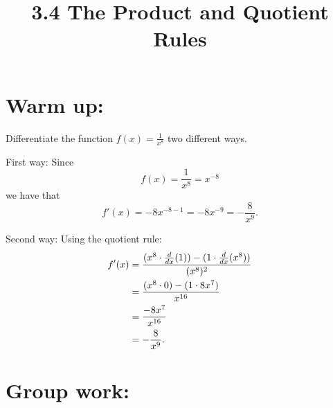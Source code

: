 \documentclass[handout,nooutcomes]{ximera}
\title{3.4 The Product and Quotient Rules}
\begin{document}
\begin{abstract}		\end{abstract}
\maketitle

\section*{Warm up:} 
Differentiate the function $f(x) = \frac{1}{x^8}$ two different ways.

	\begin{freeResponse}
	First way:  Since 
	$$f(x) = \frac{1}{x^8} = x^{-8}$$
	we have that
	$$f'(x) = -8x^{-8-1} = -8x^{-9} = -\frac{8}{x^9}.$$
	
	Second way:  Using the quotient rule: 
	\begin{align*}
	f'(x) &= \frac{(x^8 \cdot \frac{d}{dx}(1)) - (1 \cdot \frac{d}{dx}(x^8))}{(x^8)^2}  \\
	&= \frac{(x^8 \cdot 0) - (1 \cdot 8x^7)}{x^{16}}  \\
	&= \frac{-8x^7}{x^{16}}  \\
	&= - \frac{8}{x^9}.
	\end{align*}
	\end{freeResponse}
	
	
	
	
	

\section*{Group work:}
\end{document}
